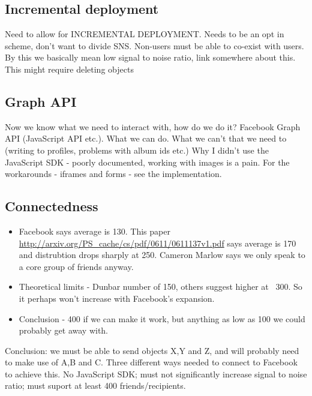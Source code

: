 \subsection{Incremental deployment}

Need to allow for INCREMENTAL DEPLOYMENT. Needs to be an opt in scheme, don't want to divide SNS. Non-users must be able to co-exist with users. By this we basically mean low signal to noise ratio, link somewhere about this. This might require deleting objects

    
\subsection{Graph API}
 
Now we know what we need to interact with, how do we do it? Facebook Graph API (JavaScript API etc.). What we can do. What we can't that we need to (writing to profiles, problems with album ids etc.) Why I didn't use the JavaScript SDK - poorly documented, working with images is a pain. For the workarounds - iframes and forms - see the implementation.
    
\subsection{Connectedness}

    \begin{itemize}
        \item Facebook says average is 130. This paper \url{http://arxiv.org/PS_cache/cs/pdf/0611/0611137v1.pdf} says average is 170 and distrubtion drops sharply at 250. Cameron Marlow says we only speak to a core group of friends anyway.
        \item Theoretical limits - Dunbar number of 150, others suggest higher at ~300. So it perhaps won't increase with Facebook's expansion.
        \item Conclusion - 400 if we can make it work, but anything as low as 100 we could probably get away with.
    \end{itemize}

Conclusion: we must be able to send objects X,Y and Z, and will probably need to make use of A,B and C. Three different ways needed to connect to Facebook to achieve this. No JavaScript SDK; must not significantly increase signal to noise ratio; must suport at least 400 friends/recipients.

    
